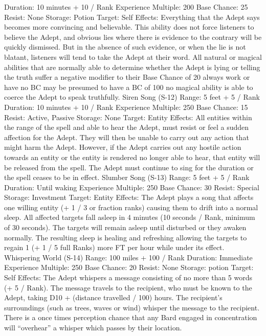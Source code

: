 \documentclass[a4paper]{article}
\begin{document}
\begin{multicols}{3}
Duration: 10 minutes + 10 / Rank
Experience Multiple: 200
Base Chance: 25%
Resist: None
Storage: Potion
Target: Self
Effects: Everything that the Adept says becomes
more convincing and believable. This ability does
not force listeners to believe the Adept, and obvious lies where there is evidence to the contrary will
be quickly dismissed. But in the absence of such
evidence, or when the lie is not blatant, listeners
will tend to take the Adept at their word. All natural or magical abilities that are normally able to
determine whether the Adept is lying or telling the
truth suffer a negative modifier to their Base
Chance of 20%
always work or have no BC may be presumed to
have a BC of 100%
no magical ability is able to coerce the Adept to
speak truthfully.
Siren Song (S-12)
Range: 5 feet + 5 / Rank
Duration: 10 minutes + 10 / Rank
Experience Multiple: 250
Base Chance: 15%
Resist: Active, Passive
Storage: None
Target: Entity
Effects: All entities within the range of the spell
and able to hear the Adept, must resist or feel a
sudden affection for the Adept. They will then be
unable to carry out any action that might harm the
Adept. However, if the Adept carries out any hostile action towards an entity or the entity is rendered no longer able to hear, that entity will be
released from the spell. The Adept must continue
to sing for the duration or the spell ceases to be in
effect.
Slumber Song (S-13)
Range: 5 feet + 5 / Rank
Duration: Until waking
Experience Multiple: 250
Base Chance: 30%
Resist: Special
Storage: Investment
Target: Entity
Effects: The Adept plays a song that affects one
willing entity (+ 1 / 3 or fraction ranks) causing
them to drift into a normal sleep. All affected targets fall asleep in 4 minutes (10 seconds / Rank,
minimum of 30 seconds). The targets will remain
asleep until disturbed or they awaken normally.
The resulting sleep is healing and refreshing allowing the targets to regain 1 (+ 1 / 5 full Ranks) more
FT per hour while under its effect.
Whispering World (S-14)
Range: 100 miles + 100 / Rank
Duration: Immediate
Experience Multiple: 250
Base Chance: 20%
Resist: None
Storage: potion
Target: Self
Effects: The Adept whispers a message consisting
of no more than 5 words (+ 5 / Rank). The message
travels to the recipient, who must be known to the
Adept, taking D10 + (distance travelled / 100)
hours. The recipient’s surroundings (such as trees,
waves or wind) whisper the message to the recipient. There is a once times perception chance that
any Bard engaged in concentration will “overhear”
a whisper which passes by their location.


\end{multicols}
\end{document}
